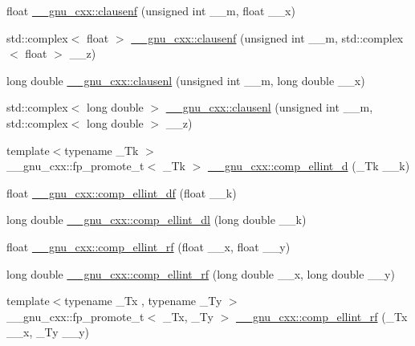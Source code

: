 \begin{DoxyCompactItemize}
\item 
float \hyperlink{group__mathsf__gnu_ga6422bdec1a3c930fb1623094cd2eaff2}{\+\_\+\+\_\+gnu\+\_\+cxx\+::clausenf} (unsigned int \+\_\+\+\_\+m, float \+\_\+\+\_\+x)
\item 
std\+::complex$<$ float $>$ \hyperlink{group__mathsf__gnu_ga98b5ba1e5de4ef2e0e9422ac8d9ce2ad}{\+\_\+\+\_\+gnu\+\_\+cxx\+::clausenf} (unsigned int \+\_\+\+\_\+m, std\+::complex$<$ float $>$ \+\_\+\+\_\+z)
\item 
long double \hyperlink{group__mathsf__gnu_ga33132bab39c8d78dde807b45fc06de52}{\+\_\+\+\_\+gnu\+\_\+cxx\+::clausenl} (unsigned int \+\_\+\+\_\+m, long double \+\_\+\+\_\+x)
\item 
std\+::complex$<$ long double $>$ \hyperlink{group__mathsf__gnu_gae39368808280f5c1b80dce7c2f4a67a7}{\+\_\+\+\_\+gnu\+\_\+cxx\+::clausenl} (unsigned int \+\_\+\+\_\+m, std\+::complex$<$ long double $>$ \+\_\+\+\_\+z)
\item 
{\footnotesize template$<$typename \+\_\+\+Tk $>$ }\\\+\_\+\+\_\+gnu\+\_\+cxx\+::fp\+\_\+promote\+\_\+t$<$ \+\_\+\+Tk $>$ \hyperlink{group__mathsf__gnu_ga3fe79a91524b43ffc5ffb83c0eb2bd00}{\+\_\+\+\_\+gnu\+\_\+cxx\+::comp\+\_\+ellint\+\_\+d} (\+\_\+\+Tk \+\_\+\+\_\+k)
\item 
float \hyperlink{group__mathsf__gnu_ga34ac6488b0e7531d5d4b7a8e31ff864e}{\+\_\+\+\_\+gnu\+\_\+cxx\+::comp\+\_\+ellint\+\_\+df} (float \+\_\+\+\_\+k)
\item 
long double \hyperlink{group__mathsf__gnu_ga494931ec0a271b79f1fdcfdf929e3138}{\+\_\+\+\_\+gnu\+\_\+cxx\+::comp\+\_\+ellint\+\_\+dl} (long double \+\_\+\+\_\+k)
\item 
float \hyperlink{group__mathsf__gnu_ga55ae30b4f8ff15017d18a80050e14e38}{\+\_\+\+\_\+gnu\+\_\+cxx\+::comp\+\_\+ellint\+\_\+rf} (float \+\_\+\+\_\+x, float \+\_\+\+\_\+y)
\item 
long double \hyperlink{group__mathsf__gnu_gae1d468487f1711e91719a9c6392f3c35}{\+\_\+\+\_\+gnu\+\_\+cxx\+::comp\+\_\+ellint\+\_\+rf} (long double \+\_\+\+\_\+x, long double \+\_\+\+\_\+y)
\item 
{\footnotesize template$<$typename \+\_\+\+Tx , typename \+\_\+\+Ty $>$ }\\\+\_\+\+\_\+gnu\+\_\+cxx\+::fp\+\_\+promote\+\_\+t$<$ \+\_\+\+Tx, \+\_\+\+Ty $>$ \hyperlink{group__mathsf__gnu_gaf6450c88127cf771acfc0667914266d1}{\+\_\+\+\_\+gnu\+\_\+cxx\+::comp\+\_\+ellint\+\_\+rf} (\+\_\+\+Tx \+\_\+\+\_\+x, \+\_\+\+Ty \+\_\+\+\_\+y)
\item 

\end{DoxyCompactItemize}
